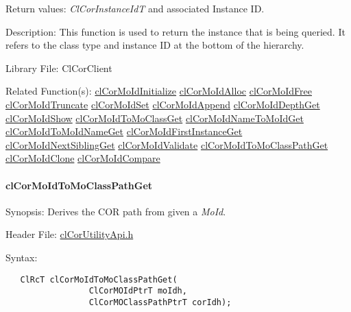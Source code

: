 \begin{Desc}
\item[Return values:]{\em Cl\-Cor\-Instance\-Id\-T\/} and associated Instance ID.\end{Desc}
\begin{Desc}
\item[Description:]This function is used to return the instance that is being queried. It refers to the class type and instance ID at the bottom of the hierarchy.\end{Desc}
\begin{Desc}
\item[Library File:]Cl\-Cor\-Client\end{Desc}
\begin{Desc}
\item[Related Function(s):]\hyperlink{group__group13}{cl\-Cor\-Mo\-Id\-Initialize} \hyperlink{group__group13}{cl\-Cor\-Mo\-Id\-Alloc} \hyperlink{group__group13}{cl\-Cor\-Mo\-Id\-Free} \hyperlink{group__group13}{cl\-Cor\-Mo\-Id\-Truncate} \hyperlink{group__group13}{cl\-Cor\-Mo\-Id\-Set} \hyperlink{group__group13}{cl\-Cor\-Mo\-Id\-Append} \hyperlink{group__group13}{cl\-Cor\-Mo\-Id\-Depth\-Get} \hyperlink{group__group13}{cl\-Cor\-Mo\-Id\-Show} \hyperlink{group__group13}{cl\-Cor\-Mo\-Id\-To\-Mo\-Class\-Get} \hyperlink{group__group13}{cl\-Cor\-Mo\-Id\-Name\-To\-Mo\-Id\-Get} \hyperlink{group__group13}{cl\-Cor\-Mo\-Id\-To\-Mo\-Id\-Name\-Get} \hyperlink{group__group13}{cl\-Cor\-Mo\-Id\-First\-Instance\-Get} \hyperlink{group__group13}{cl\-Cor\-Mo\-Id\-Next\-Sibling\-Get} \hyperlink{group__group13}{cl\-Cor\-Mo\-Id\-Validate} \hyperlink{group__group13}{cl\-Cor\-Mo\-Id\-To\-Mo\-Class\-Path\-Get} \hyperlink{group__group13}{cl\-Cor\-Mo\-Id\-Clone} \hyperlink{group__group13}{cl\-Cor\-Mo\-Id\-Compare} \end{Desc}
\hypertarget{pagecor243}{}\paragraph{cl\-Cor\-Mo\-Id\-To\-Mo\-Class\-Path\-Get}\label{pagecor243}
\begin{Desc}
\item[Synopsis:]Derives the COR path from given a {\em Mo\-Id\/}.\end{Desc}
\begin{Desc}
\item[Header File:]\hyperlink{cl_cor_utility_api_8h}{cl\-Cor\-Utility\-Api.h}\end{Desc}
\begin{Desc}
\item[Syntax:]

\footnotesize\begin{verbatim}   ClRcT clCorMoIdToMoClassPathGet(
                 ClCorMOIdPtrT moIdh,
                 ClCorMOClassPathPtrT corIdh);
\end{verbatim}
\normalsize
\end{Desc}
